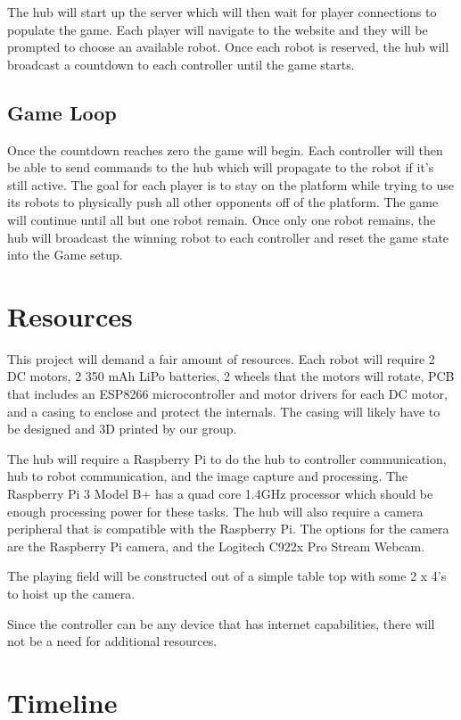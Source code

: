 \documentclass[11pt]{ieeeconf}
\begin{document}
The hub will start up the server which will then wait for player connections to populate the game. Each player will navigate to the website and they will be prompted to choose an available robot. Once each robot is reserved, the hub will broadcast a countdown to each controller until the game starts. 

\subsection{Game Loop}

Once the countdown reaches zero the game will begin. Each controller will then be able to send commands to the hub which will propagate to the robot if it's still active. The goal for each player is to stay on the platform while trying to use its robots to physically push all other opponents off of the platform. The game will continue until all but one robot remain. Once only one robot remains, the hub will broadcast the winning robot to each controller and reset the game state into the Game setup. 

\section{Resources}

This project will demand a fair amount of resources. Each robot will require 2 DC motors, 2 350 mAh LiPo batteries, 2 wheels that the motors will rotate, PCB that includes an ESP8266 microcontroller and motor drivers for each DC motor, and a casing to enclose and protect the internals. The casing will likely have to be designed and 3D printed by our group.

The hub will require a Raspberry Pi to do the hub to controller communication, hub to robot communication, and the image capture and processing. The Raspberry Pi 3 Model B+ has a quad core 1.4GHz processor which should be enough processing power for these tasks. The hub will also require a camera peripheral that is compatible with the Raspberry Pi. The options for the camera are the Raspberry Pi camera, and the Logitech C922x Pro Stream Webcam. 

The playing field will be constructed out of a simple table top with some 2 x 4's to hoist up the camera.

Since the controller can be any device that has internet capabilities, there will not be a need for additional resources.

\section{Timeline}
\end{document}
